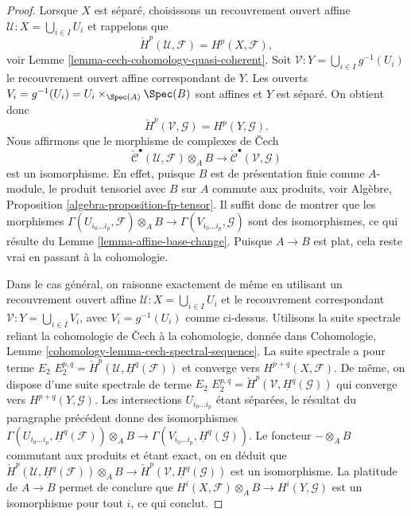 \begin{proof}
Lorsque $X$ est séparé, choisissons un recouvrement ouvert affine
$\mathcal{U} : X = \bigcup_{i \in I} U_i$ et rappelons que
$$
\check{H}^p(\mathcal{U}, \mathcal{F}) = H^p(X, \mathcal{F}),
$$
voir
Lemme \ref{lemma-cech-cohomology-quasi-coherent}.
Soit $\mathcal{V} : Y = \bigcup_{i \in I} g^{-1}(U_i)$
le recouvrement ouvert affine correspondant de $Y$.
Les ouverts $V_i = g^{-1}(U_i) = U_i \times_{\Spec(A)} \Spec(B)$
sont affines et $Y$ est séparé. On obtient donc
$$
\check{H}^p(\mathcal{V}, \mathcal{G}) = H^p(Y, \mathcal{G}).
$$
Nous affirmons que le morphisme de complexes de {\v C}ech
$$
\check{\mathcal{C}}^\bullet(\mathcal{U}, \mathcal{F}) \otimes_A B
\longrightarrow
\check{\mathcal{C}}^\bullet(\mathcal{V}, \mathcal{G})
$$
est un isomorphisme. En effet, puisque $B$ est de présentation finie comme $A$-module,
le produit tensoriel avec $B$ sur $A$ commute aux produits, voir
Algèbre, Proposition \ref{algebra-proposition-fp-tensor}.
Il suffit donc de montrer que les morphismes
$\Gamma(U_{i_0 \ldots i_p}, \mathcal{F}) \otimes_A B \to
\Gamma(V_{i_0 \ldots i_p}, \mathcal{G})$ 
sont des isomorphismes, ce qui résulte du
Lemme \ref{lemma-affine-base-change}.
Puisque $A \to B$ est plat, cela reste vrai en passant à la cohomologie.

\medskip\noindent
Dans le cas général, on raisonne exactement de même en utilisant un recouvrement
ouvert affine $\mathcal{U} : X = \bigcup_{i \in I} U_i$ et le
recouvrement correspondant $\mathcal{V} : Y = \bigcup_{i \in I} V_i$,
avec $V_i = g^{-1}(U_i)$ comme ci-dessus. Utilisons la
suite spectrale reliant la cohomologie de {\v C}ech à la cohomologie, donnée dans
Cohomologie, Lemme \ref{cohomology-lemma-cech-spectral-sequence}.
La suite spectrale a pour terme $E_2$
$E_2^{p, q} = \check{H}^p(\mathcal{U}, \underline{H}^q(\mathcal{F}))$
et converge vers $H^{p + q}(X, \mathcal{F})$.
De même, on dispose d'une suite spectrale de terme $E_2$
$E_2^{p, q} = \check{H}^p(\mathcal{V}, \underline{H}^q(\mathcal{G}))$
qui converge vers $H^{p + q}(Y, \mathcal{G})$.
Les intersections $U_{i_0 \ldots i_p}$ étant séparées, le résultat
du paragraphe précédent donne des isomorphismes
$\Gamma(U_{i_0 \ldots i_p}, \underline{H}^q(\mathcal{F})) \otimes_A B
\to \Gamma(V_{i_0 \ldots i_p}, \underline{H}^q(\mathcal{G}))$.
Le foncteur $- \otimes_A B$ commutant aux produits et étant exact, on en déduit
que
$\check{H}^p(\mathcal{U}, \underline{H}^q(\mathcal{F})) \otimes_A B
\to \check{H}^p(\mathcal{V}, \underline{H}^q(\mathcal{G}))$
est un isomorphisme. La platitude de $A \to B$ permet de conclure que
$H^i(X, \mathcal{F}) \otimes_A B \to H^i(Y, \mathcal{G})$
est un isomorphisme pour tout $i$, ce qui conclut.
\end{proof}






